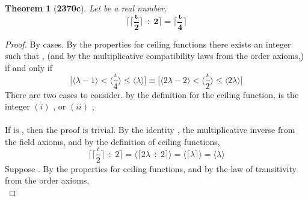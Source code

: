 \documentclass[preview]{standalone}
\newtheorem{theorem}{Theorem}
\begin{document}
\begin{theorem}[\textbf{2370c}]
    Let \bm{$\iota$} be a real number.
    \begin{equation*}
        \bm{
            \Bigg \lceil \bigg \lceil \frac{\iota}{2} \bigg \rceil \div 2 \Bigg \rceil 
                = 
            \Bigg \lceil \frac{\iota}{4} \Bigg \rceil
        }
    \end{equation*}
\end{theorem}

\begin{proof}
    By cases.
    By the properties for ceiling functions there exists an integer \bm{$\lambda$} such that
    , 
    (and by the multiplicative compatibility laws from the order axioms,)
    if and only if
    \begin{equation*}
        \bigg[
            \Big \langle \lambda - 1 \Big \rangle
                < 
            \Big \langle \frac{\iota}{4} \Big \rangle 
                \le 
            \Big \langle \lambda \Big \rangle
        \bigg]
            \equiv
        \bigg[
            \Big \langle 2 \lambda - 2 \Big \rangle
                < 
            \Big \langle \frac{\iota}{2} \Big \rangle 
                \le 
            \Big \langle 2 \lambda \Big \rangle
        \bigg]
    \end{equation*}
    There are two cases to consider. 
    by the definition for the ceiling function, 
     is the integer
    $(i)$ \bm{$2 \lambda$}, or $(ii)$ ,
    \\ \\
     If  is \bm{$2 \lambda$},
    then the proof is trivial. By the identity \bm{$\lambda$}, 
    the multiplicative inverse from the field axioms, 
    and by the definition of ceiling functions, 
    \begin{equation*}
        \bigg \lceil \Big \lceil \frac{\iota}{2} \Big \rceil \div 2 \bigg \rceil
            =
        \bigg \langle \big \lceil 2 \lambda \div 2 \big \rceil \bigg \rangle
            =
        \bigg \langle \big \lceil \lambda \big \rceil \bigg \rangle
            =
        \bigg \langle \lambda \bigg \rangle
    \end{equation*}
     Suppose .
    By the properties for ceiling functions,
    and by the law of transitivity from the order axioms,
    \begin{equation*}

\end{equation*}
\end{proof}
\end{document}
